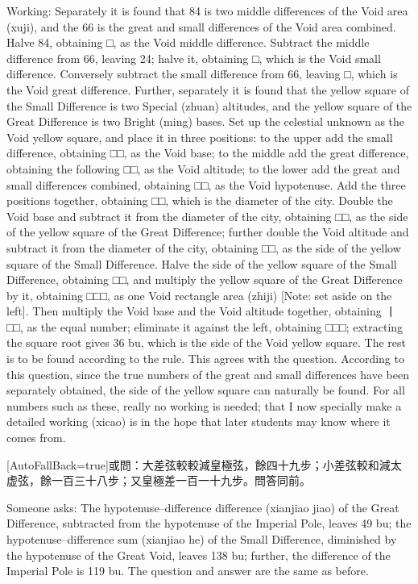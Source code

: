 \documentclass[11pt]{article}
\newcommand{\unitlabel}[1]{\marginpar{\raggedleft\tiny\color{gray}#1}}
\newenvironment{unitzh}{\par\CJKfontspec{Noto Serif CJK SC}[AutoFallBack=true]\large\linespread{1.25}\selectfont}{\par}
\newenvironment{uniten}{\par\small\color{black!85}}{\par\medskip}
\begin{document}
\begin{uniten}Working: Separately it is found that 84 is two middle differences of the Void area (xuji), and the 66 is the great and small differences of the Void area combined. Halve 84, obtaining □, as the Void middle difference. Subtract the middle difference from 66, leaving 24; halve it, obtaining □, which is the Void small difference. Conversely subtract the small difference from 66, leaving □, which is the Void great difference. Further, separately it is found that the yellow square of the Small Difference is two Special (zhuan) altitudes, and the yellow square of the Great Difference is two Bright (ming) bases. Set up the celestial unknown as the Void yellow square, and place it in three positions: to the upper add the small difference, obtaining □□, as the Void base; to the middle add the great difference, obtaining the following □□, as the Void altitude; to the lower add the great and small differences combined, obtaining □□, as the Void hypotenuse. Add the three positions together, obtaining □□, which is the diameter of the city. Double the Void base and subtract it from the diameter of the city, obtaining □□, as the side of the yellow square of the Great Difference; further double the Void altitude and subtract it from the diameter of the city, obtaining □□, as the side of the yellow square of the Small Difference. Halve the side of the yellow square of the Small Difference, obtaining □□, and multiply the yellow square of the Great Difference by it, obtaining □□□, as one Void rectangle area (zhiji) [Note: set aside on the left]. Then multiply the Void base and the Void altitude together, obtaining 丨□□, as the equal number; eliminate it against the left, obtaining □□□; extracting the square root gives 36 bu, which is the side of the Void yellow square. The rest is to be found according to the rule. This agrees with the question. According to this question, since the true numbers of the great and small differences have been separately obtained, the side of the yellow square can naturally be found. For all numbers such as these, really no working is needed; that I now specially make a detailed working (xicao) is in the hope that later students may know where it comes from.\end{uniten}

\begin{unitzh}\unitlabel{ceyuan-030.8}或問：大差弦較較減皇極弦，餘四十九步；小差弦較和減太虚弦，餘一百三十八步；又皇極差一百一十九步。問答同前。\end{unitzh}
\begin{uniten}Someone asks: The hypotenuse–difference difference (xianjiao jiao) of the Great Difference, subtracted from the hypotenuse of the Imperial Pole, leaves 49 bu; the hypotenuse–difference sum (xianjiao he) of the Small Difference, diminished by the hypotenuse of the Great Void, leaves 138 bu; further, the difference of the Imperial Pole is 119 bu. The question and answer are the same as before.\end{uniten}
\end{document}
